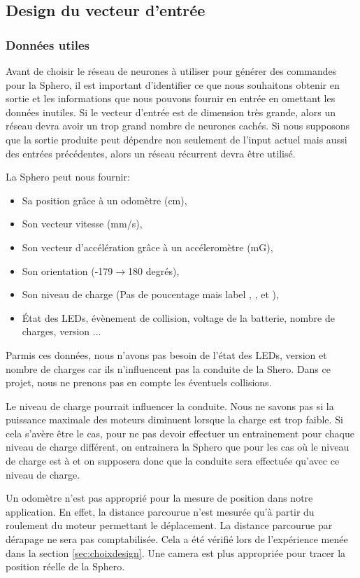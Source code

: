 \subsection{Design du vecteur d'entrée}
\subsubsection{Données utiles}
Avant de choisir le réseau de neurones à utiliser pour générer des commandes pour la Sphero, il est important d'identifier ce que nous souhaitons obtenir en sortie et les informations que nous pouvons fournir en entrée en omettant les données inutiles.
Si le vecteur d'entrée est de dimension très grande, alors un réseau \rbf devra avoir un trop grand nombre de neurones cachés\cite{Gauthier}.
Si nous supposons que la sortie produite peut dépendre non seulement de l'input actuel mais aussi des entrées précédentes, alors un réseau récurrent devra être utilisé.

La Sphero peut nous fournir\cite{SDKofficiels}:
\begin{itemize}
 \item Sa position grâce à un odomètre (cm),
 \item Son vecteur vitesse (mm/s),
 \item Son vecteur d'accélération grâce à un accéleromètre (mG),
 \item Son orientation (-179$\rightarrow$180 degrés),
 \item Son niveau de charge (Pas de poucentage mais label , ,  et ),
 \item État des LEDs, évènement de collision, voltage de la batterie, nombre de charges, version ...
\end{itemize}

Parmis ces données, nous n'avons pas besoin de l'état des LEDs, version et nombre de charges car ils n'influencent pas la conduite de la Shero.
Dans ce projet, nous ne prenons pas en compte les éventuels collisions.

Le niveau de charge pourrait influencer la conduite.
Nous ne savons pas si la puissance maximale des moteurs diminuent lorsque la charge est trop faible.
Si cela s'avère être le cas, pour ne pas devoir effectuer un entrainement pour chaque niveau de charge différent, on entrainera la Sphero que pour les cas où le niveau de charge est à  et on supposera donc que la conduite sera effectuée qu'avec ce niveau de charge.

Un odomètre n'est pas approprié pour la mesure de position dans notre application.
En effet, la distance parcourue n'est mesurée qu'à partir du roulement du moteur permettant le déplacement.
La distance parcourue par dérapage ne sera pas comptabilisée.
Cela a été vérifié lors de l'expérience menée dans la section \ref{sec:choixdesign}.
Une camera est plus appropriée pour tracer la position réelle de la Sphero.

